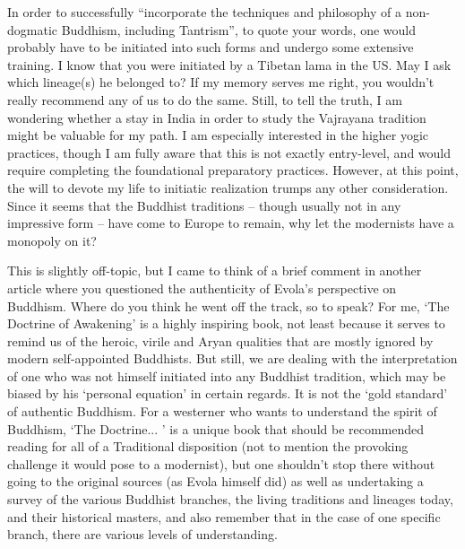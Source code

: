 \begin{footnotesize}
\begin{sffamily}
In order to successfully ``incorporate the techniques and philosophy of a non-dogmatic Buddhism, including Tantrism'', to quote your words, one would probably have to be initiated into such forms and undergo some extensive training. I know that you were initiated by a Tibetan lama in the US. May I ask which lineage(s) he belonged to? If my memory serves me right, you wouldn't really recommend any of us to do the same. Still, to tell the truth, I am wondering whether a stay in India in order to study the Vajrayana tradition might be valuable for my path. I am especially interested in the higher yogic practices, though I am fully aware that this is not exactly entry-level, and would require completing the foundational preparatory practices. However, at this point, the will to devote my life to initiatic realization trumps any other consideration. Since it seems that the Buddhist traditions -- though usually not in any impressive form -- have come to Europe to remain, why let the modernists have a monopoly on it?

This is slightly off-topic, but I came to think of a brief comment in another article where you questioned the authenticity of Evola's perspective on Buddhism. Where do you think he went off the track, so to speak? For me, `The Doctrine of Awakening' is a highly inspiring book, not least because it serves to remind us of the heroic, virile and Aryan qualities that are mostly ignored by modern self-appointed Buddhists. But still, we are dealing with the interpretation of one who was not himself initiated into any Buddhist tradition, which may be biased by his `personal equation' in certain regards. It is not the `gold standard' of authentic Buddhism. For a westerner who wants to understand the spirit of Buddhism, `The Doctrine... ' is a unique book that should be recommended reading for all of a Traditional disposition (not to mention the provoking challenge it would pose to a modernist), but one shouldn't stop there without going to the original sources (as Evola himself did) as well as undertaking a survey of the various Buddhist branches, the living traditions and lineages today, and their historical masters, and also remember that in the case of one specific branch, there are various levels of understanding.


\end{sffamily}
\end{footnotesize}
